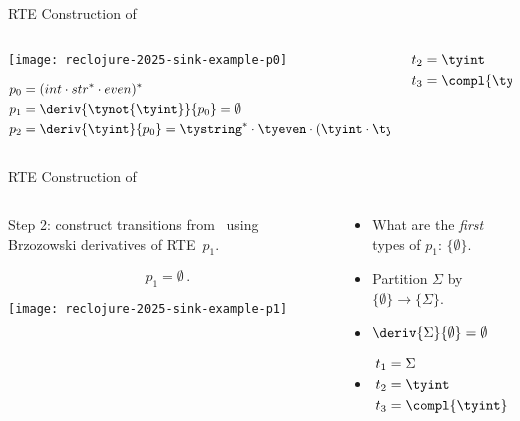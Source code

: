 \begin{frame}{RTE Construction  of }
  \begin{columns}
    \begin{column}{0.5\textwidth}
      \texttt{[image: reclojure-2025-sink-example-p0]}

      \begin{align*}
        p_0 &= (int \cdot str^{*} \cdot even)^{*}\\
        p_1 &= \deriv{\tynot{\tyint}}{p_0} = \emptyset\\
        p_2 &= \deriv{\tyint}{p_0}    
        = \tystring^{*} \cdot \tyeven \cdot (\tyint \cdot \tystring^{*} \cdot \tyeven)^{*}
      \end{align*}

    \end{column}
    \begin{column}{0.5\textwidth}
      \begin{align*}
        t_2 &= \tyint  \\
        t_3 &= \compl{\tyint}
      \end{align*}
    \end{column}
  \end{columns}
\end{frame}
\begin{frame}{RTE Construction of }
  \begin{columns}
    \begin{column}{0.45\textwidth}
      Step 2: construct transitions from~ using Brzozowski derivatives of RTE~$p_1$.

      \[p_1=\emptyset\,.\]

      \texttt{[image: reclojure-2025-sink-example-p1]}
    \end{column}
    \begin{column}{0.55\textwidth}
      \begin{itemize}
      \item<1->{What are the \emph{first} types of $p_1$: $\{\emptyset\}$.}
      \item<2->{Partition $\Sigma$ by $\{\emptyset\} \to \{\Sigma\}$.}
      \item<3->{$\deriv{\Sigma}{\emptyset} = \emptyset$}
      \item<4->{      \begin{align*}
        t_1 &= \Sigma\\
        t_2 &= \tyint  \\
        t_3 &= \compl{\tyint}
      \end{align*}}
      \end{itemize}
    \end{column}
  \end{columns}
\end{frame}



